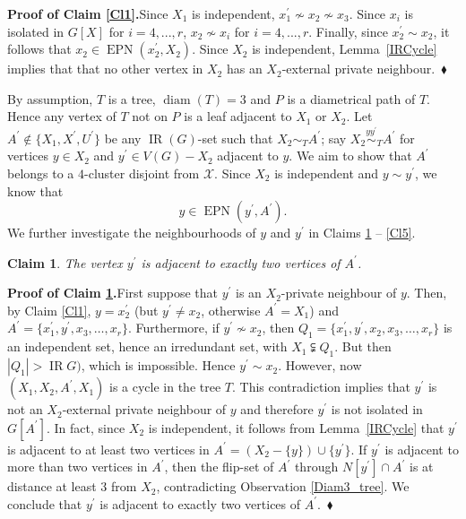 \documentclass[12pt]{article}%
\newtheorem{claim}{Claim}
\begin{document}
\noindent\textbf{Proof of Claim \ref{Cl1}.\hspace{0.1in}}Since $X_{1}$ is
independent, $x_{1}^{\prime}\nsim x_{2}\nsim x_{3}$. Since $x_{i}$ is isolated
in $G[X]$ for $i=4,...,r$, $x_{2}\nsim x_{i}$ for $i=4,...,r$. Finally, since
$x_{2}^{\prime}\sim x_{2}$, it follows that $x_{2}\in\operatorname{EPN}%
(x_{2}^{\prime},X_{2})$. Since $X_{2}$ is independent, Lemma~\ref{IRCycle}
implies that that no other vertex in $X_{2}$ has an $X_{2}$-external private
neighbour.~$\blacklozenge$\medskip

By assumption, $T$ is a tree, $\operatorname{diam}(T)=3$ and $P$ is a
diametrical path of $T$. Hence any vertex of $T$ not on $P$ is a leaf adjacent
to $X_{1}$ or $X_{2}$. Let $A^{\prime}\notin\{X_{1},X^{\prime},U^{\prime}\}$
be any $\operatorname{IR}(G)$-set such that $X_{2}\sim_{T}A^{\prime}$; say
$X_{2}\overset{yy^{\prime}}{\sim}_{T}A^{\prime}$ for vertices $y\in X_{2}$ and
$y^{\prime}\in V(G)-X_{2}$ adjacent to $y$. We aim to show that $A^{\prime}$
belongs to a $4$-cluster disjoint from $\mathcal{X}$. Since $X_{2}$ is
independent and $y\sim y^{\prime}$, we know that
\begin{equation}
y\in\operatorname{EPN}(y^{\prime},A^{\prime}). \label{eq_y'}%
\end{equation}
We further investigate the neighbourhoods of $y$ and $y^{\prime}$ in Claims
\ref{Cl2} -- \ref{Cl5}.

\begin{claim}
\label{Cl2}The vertex $y^{\prime}$ is adjacent to exactly two vertices of
$A^{\prime}$.
\end{claim}

\noindent\textbf{Proof of Claim \ref{Cl2}.\hspace{0.1in}}First suppose that
$y^{\prime}$ is an $X_{2}$-private neighbour of $y$. Then, by Claim \ref{Cl1},
$y=x_{2}^{\prime}$ (but $y^{\prime}\neq x_{2}$, otherwise $A^{\prime}=X_{1}$)
and $A^{\prime}=\{x_{1}^{\prime},y^{\prime},x_{3},\dots,x_{r}\}$. Furthermore,
if $y^{\prime}\nsim x_{2}$, then $Q_{1}=\{x_{1}^{\prime},y^{\prime}%
,x_{2},x_{3},\dots,x_{r}\}$ is an independent set, hence an irredundant set,
with $X_{1}\subsetneqq Q_{1}$. But then $|Q_{1}|>\operatorname{IR}G)$, which
is impossible. Hence $y^{\prime}\sim x_{2}$. However, now $(X_{1}%
,X_{2},A^{\prime},X_{1})$ is a cycle in the tree $T$. This contradiction
implies that $y^{\prime}$ is not an $X_{2}$-external private neighbour of $y$
and therefore $y^{\prime}$ is not isolated in $G[A^{\prime}]$. In fact, since
$X_{2}$ is independent, it follows from Lemma~\ref{IRCycle} that $y^{\prime}$
is adjacent to at least two vertices in $A^{\prime}=(X_{2}-\{y\})\cup
\{y^{\prime}\}$. If $y^{\prime}$ is adjacent to more than two vertices in
$A^{\prime}$, then the flip-set of $A^{\prime}$ through $N[y^{\prime}]\cap
A^{\prime}$ is at distance at least $3$ from $X_{2}$, contradicting
Observation \ref{Diam3_tree}. We conclude that $y^{\prime}$ is adjacent to
exactly two vertices of $A^{\prime}$.~$\blacklozenge$\medskip
\end{document}
